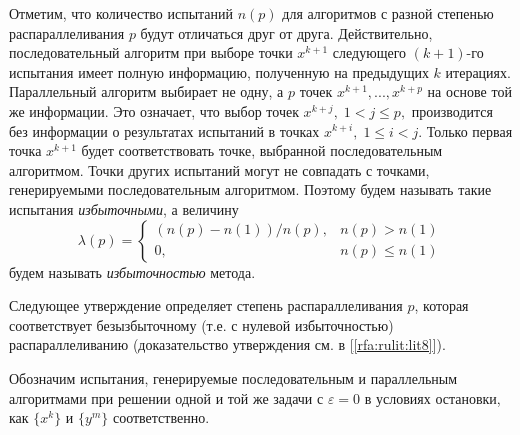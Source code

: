 \documentclass[10pt,a4paper]{book}
\begin{document}
Отметим, что количество испытаний $n(p)$ для алгоритмов с разной степенью распараллеливания $p$ будут отличаться друг от друга. Действительно, последовательный алгоритм при выборе точки $x^{k+1}$ следующего $(k+1)$-го испытания имеет полную информацию, полученную на предыдущих $k$ итерациях. Параллельный алгоритм выбирает не одну, а $p$ точек $x^{k+1},..., x^{k+p}$  на основе той же информации. Это означает, что выбор точек $x^{k+j}, \; 1 < j \leq p,$ производится без информации о результатах испытаний в точках $x^{k+i},\; 1 \leq i < j$. Только первая точка $x^{k+1}$ будет соответствовать точке, выбранной последовательным алгоритмом. Точки других испытаний могут не совпадать с точками, генерируемыми последовательным алгоритмом. Поэтому будем называть такие испытания \textit{избыточными}, а величину
\begin{displaymath}
\lambda(p) = \left\{ \begin{array}{ll}
                (n(p) - n(1)) / n(p), & \textrm{$n(p) > n(1)$}\\
                0, & \textrm{$n(p) \leq n(1)$}
  \end{array} \right.
\end{displaymath}
будем называть \textit{избыточностью} метода.

Следующее утверждение определяет степень распараллеливания $p$, которая соответствует безызбыточному (т.е. с нулевой избыточностью) распараллеливанию (доказательство утверждения см. в [\ref{rfa:rulit:lit8}]). 

Обозначим испытания, генерируемые последовательным и параллельным алгоритмами при решении одной и той же задачи с $\varepsilon=0$ в условиях остановки, как $\{x^k\}$ и $\{y^m \}$ соответственно.
\end{document}
